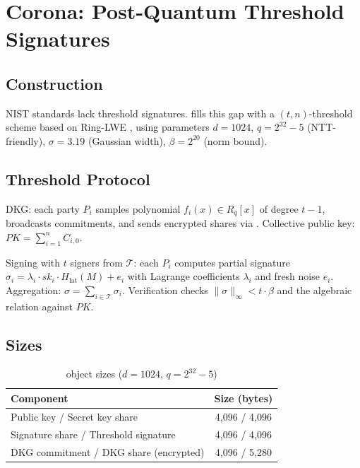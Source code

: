 \section{Corona: Post-Quantum Threshold Signatures}


\subsection{Construction}

NIST standards lack threshold signatures. \Corona{} fills this gap with a $(t, n)$-threshold scheme based on Ring-LWE \cite{lyubashevsky2010ideal, lux-corona-pq}, using parameters $d = 1024$, $q = 2^{32} - 5$ (NTT-friendly), $\sigma = 3.19$ (Gaussian width), $\beta = 2^{20}$ (norm bound).

\subsection{Threshold Protocol}

DKG: each party $P_i$ samples polynomial $f_i(x) \in R_q[x]$ of degree $t - 1$, broadcasts commitments, and sends encrypted shares via \MLKEM{}. Collective public key: $PK = \sum_{i=1}^{n} C_{i,0}$.

Signing with $t$ signers from $\mathcal{T}$: each $P_i$ computes partial signature $\sigma_i = \lambda_i \cdot sk_i \cdot H_{\text{lat}}(M) + e_i$ with Lagrange coefficients $\lambda_i$ and fresh noise $e_i$. Aggregation: $\sigma = \sum_{i \in \mathcal{T}} \sigma_i$. Verification checks $\|\sigma\|_\infty < t \cdot \beta$ and the algebraic relation against $PK$.

\subsection{Sizes}

\begin{table}[h]
\centering
\begin{tabular}{lc}
\toprule
\textbf{Component} & \textbf{Size (bytes)} \\
\midrule
Public key / Secret key share & 4,096 / 4,096 \\
Signature share / Threshold signature & 4,096 / 4,096 \\
DKG commitment / DKG share (encrypted) & 4,096 / 5,280 \\
\bottomrule
\end{tabular}
\caption{\Corona{} object sizes ($d = 1024$, $q = 2^{32} - 5$)}
\label{tab:corona-sizes}
\end{table}

